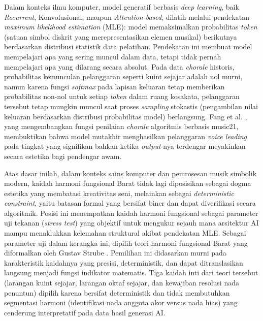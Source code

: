 Dalam konteks ilmu komputer, model generatif berbasis \textit{deep learning}, baik \textit{Recurrent}, Konvolusional, maupun \textit{Attention-based}, dilatih melalui pendekatan \textit{maximum likelihood estimation} (MLE): model memaksimalkan probabilitas \textit{token} (satuan simbol diskrit yang merepresentasikan elemen musikal) berikutnya berdasarkan distribusi statistik data pelatihan. Pendekatan ini membuat model mempelajari apa yang sering muncul dalam data, tetapi tidak pernah mempelajari apa yang dilarang secara absolut. Pada data \textit{chorale} historis, probabilitas kemunculan pelanggaran seperti kuint sejajar adalah nol murni, namun karena fungsi \textit{softmax} pada lapisan keluaran tetap memberikan probabilitas non-nol untuk setiap \textit{token} dalam ruang kosakata, pelanggaran tersebut tetap mungkin muncul saat proses \textit{sampling} stokastis (pengambilan nilai keluaran berdasarkan distribusi probabilitas model) berlangsung. Fang et al. \parencite{fang2020}, yang mengembangkan fungsi penilaian \textit{chorale} algoritmis berbasis music21, membuktikan bahwa model mutakhir menghasilkan pelanggaran \textit{voice leading} pada tingkat yang signifikan bahkan ketika \textit{output}-nya terdengar meyakinkan secara estetika bagi pendengar awam.

Atas dasar inilah, dalam konteks sains komputer dan pemrosesan musik simbolik modern, kaidah harmoni fungsional Barat tidak lagi diposisikan sebagai dogma estetika yang membatasi kreativitas seni, melainkan sebagai \textit{deterministic constraint}, yaitu batasan formal yang bersifat biner dan dapat diverifikasi secara algoritmik. Posisi ini menempatkan kaidah harmoni fungsional sebagai parameter uji tekanan (\textit{stress test}) yang objektif untuk mengukur sejauh mana arsitektur AI mampu menaklukkan kelemahan struktural akibat pendekatan MLE. Sebagai parameter uji dalam kerangka ini, dipilih teori harmoni fungsional Barat yang diformalkan oleh Gustav Strube \parencite{strube1928}. Pemilihan ini didasarkan murni pada karakteristik kaidahnya yang presisi, deterministik, dan dapat ditranslasikan langsung menjadi fungsi indikator matematis. Tiga kaidah inti dari teori tersebut (larangan kuint sejajar, larangan oktaf sejajar, dan kewajiban resolusi nada penuntun) dipilih karena bersifat deterministik dan tidak membutuhkan segmentasi harmoni (identifikasi nada anggota akor versus nada hias) yang cenderung interpretatif pada data hasil generasi AI.

